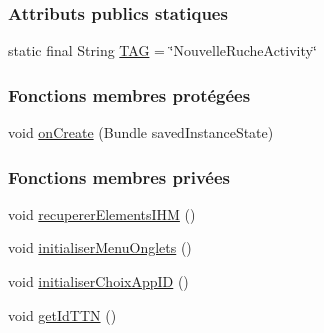 \subsubsection*{Attributs publics statiques}
\begin{DoxyCompactItemize}
\item 
static final String \hyperlink{classfr_1_1campus_1_1laurainc_1_1honeybee_1_1_nouvelle_ruche_activity_afa1372bcc0387e18df3877ebe605670d}{T\+AG} = \char`\"{}Nouvelle\+Ruche\+Activity\char`\"{}
\end{DoxyCompactItemize}
\subsubsection*{Fonctions membres protégées}
\begin{DoxyCompactItemize}
\item 
void \hyperlink{classfr_1_1campus_1_1laurainc_1_1honeybee_1_1_nouvelle_ruche_activity_ae97fec78fb0a2e1cc4610182bc71ea0d}{on\+Create} (Bundle saved\+Instance\+State)
\end{DoxyCompactItemize}
\subsubsection*{Fonctions membres privées}
\begin{DoxyCompactItemize}
\item 
void \hyperlink{classfr_1_1campus_1_1laurainc_1_1honeybee_1_1_nouvelle_ruche_activity_adde8644c7ea0259edebc36f15de7a891}{recuperer\+Elements\+I\+HM} ()
\item 
void \hyperlink{classfr_1_1campus_1_1laurainc_1_1honeybee_1_1_nouvelle_ruche_activity_ad9bdfb01df8d7402b4da9858f263e1fd}{initialiser\+Menu\+Onglets} ()
\item 
void \hyperlink{classfr_1_1campus_1_1laurainc_1_1honeybee_1_1_nouvelle_ruche_activity_a25bf91899b217681bda733e7783d0bf9}{initialiser\+Choix\+App\+ID} ()
\item 
void \hyperlink{classfr_1_1campus_1_1laurainc_1_1honeybee_1_1_nouvelle_ruche_activity_a83e03af4d233629129a31cd78f762551}{get\+Id\+T\+TN} ()
\end{DoxyCompactItemize}
